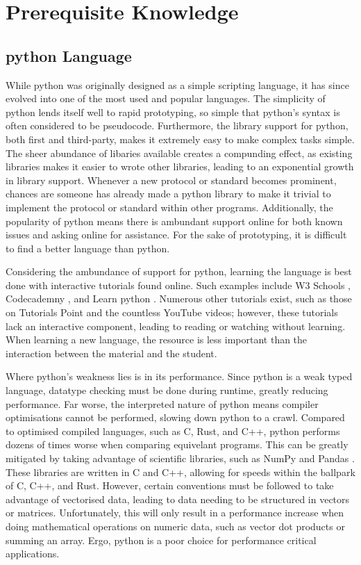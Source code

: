 \documentclass[11pt]{article}
\begin{document}
\section{Prerequisite Knowledge}

\subsection{\Gls{python} Language}

While \Gls{python} was originally designed as a simple scripting language, it has since evolved into one of the most used and popular languages. The simplicity of \Gls{python} lends itself well to rapid prototyping, so simple that \Gls{python}'s syntax is often considered to be \gls{pseudocode}. Furthermore, the \gls{library} support for \Gls{python}, both first and third-party, makes it extremely easy to make complex tasks simple. The sheer abundance of libaries available creates a compunding effect, as existing libraries makes it easier to wrote other libraries, leading to an exponential growth in \gls{library} support. Whenever a new protocol or standard becomes prominent, chances are someone has already made a \Gls{python} \gls{library} to make it trivial to implement the protocol or standard within other programs. Additionally, the popularity of \Gls{python} means there is ambundant support online for both known issues and asking online for assistance. For the sake of prototyping, it is difficult to find a better language than \Gls{python}.

Considering the ambundance of support for \Gls{python}, learning the language is best done with interactive tutorials found online. Such examples include W3 Schools \cite{w3-schools-python}, Codecademny \cite{codecademy-python}, and Learn \Gls{python} \cite{learn-python}. Numerous other tutorials exist, such as those on Tutorials Point \cite{tutorialspoint-python} and the countless YouTube videos; however, these tutorials lack an interactive component, leading to reading or watching without learning. When learning a new language, the resource is less important than the interaction between the material and the student.

Where \Gls{python}'s weakness lies is in its performance. Since \Gls{python} is a weak typed language, datatype checking must be done during runtime, greatly reducing performance. Far worse, the interpreted nature of \Gls{python} means compiler optimisations cannot be performed, slowing down \Gls{python} to a crawl. Compared to optimised compiled languages, such as C, Rust, and C++, \Gls{python} performs dozens of times worse when comparing equivelant programs. This can be greatly mitigated by taking advantage of scientific libraries, such as NumPy \cite{numpy} and Pandas \cite{pandas}. These libraries are written in C and C++, allowing for speeds within the ballpark of C, C++, and Rust. However, certain conventions must be followed to take advantage of vectorised data, leading to data needing to be structured in vectors or matrices. Unfortunately, this will only result in a performance increase when doing mathematical operations on numeric data, such as vector dot products or summing an \gls{array}. Ergo, \Gls{python} is a poor choice for performance critical applications.
\end{document}
